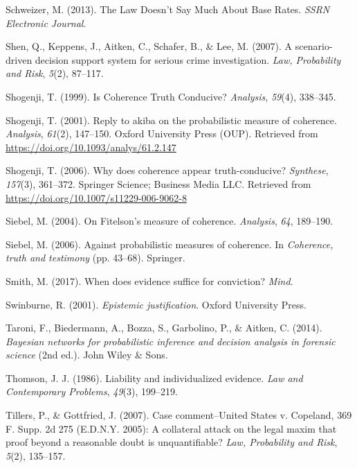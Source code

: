 \documentclass[11pt,dvipsnames,enabledeprecatedfontcommands]{scrartcl}
\begin{document}
\hypertarget{ref-schweizer2013LawDoesnSay}{}
Schweizer, M. (2013). The Law Doesn't Say Much About Base Rates.
\emph{SSRN Electronic Journal}.

\hypertarget{ref-shen2007ScenariodrivenDecisionSupporta}{}
Shen, Q., Keppens, J., Aitken, C., Schafer, B., \& Lee, M. (2007). A
scenario-driven decision support system for serious crime investigation.
\emph{Law, Probability and Risk}, \emph{5}(2), 87--117.

\hypertarget{ref-shogenji1999}{}
Shogenji, T. (1999). Is Coherence Truth Conducive? \emph{Analysis},
\emph{59}(4), 338--345.

\hypertarget{ref-Shogenji2001Reply}{}
Shogenji, T. (2001). Reply to akiba on the probabilistic measure of
coherence. \emph{Analysis}, \emph{61}(2), 147--150. Oxford University
Press (OUP). Retrieved from
\url{https://doi.org/10.1093/analys/61.2.147}

\hypertarget{ref-Shogenji2006Why}{}
Shogenji, T. (2006). Why does coherence appear truth-conducive?
\emph{Synthese}, \emph{157}(3), 361--372. Springer Science; Business
Media LLC. Retrieved from
\url{https://doi.org/10.1007/s11229-006-9062-8}

\hypertarget{ref-Siebel2004On-Fitelsons-me}{}
Siebel, M. (2004). On Fitelson's measure of coherence. \emph{Analysis},
\emph{64}, 189--190.

\hypertarget{ref-siebel2006against}{}
Siebel, M. (2006). Against probabilistic measures of coherence. In
\emph{Coherence, truth and testimony} (pp. 43--68). Springer.

\hypertarget{ref-Smith_conviction_mind_2017}{}
Smith, M. (2017). When does evidence suffice for conviction?
\emph{Mind}.

\hypertarget{ref-Swinburne2001-SWIEJ}{}
Swinburne, R. (2001). \emph{Epistemic justification}. Oxford University
Press.

\hypertarget{ref-taroni2006bayesian}{}
Taroni, F., Biedermann, A., Bozza, S., Garbolino, P., \& Aitken, C.
(2014). \emph{Bayesian networks for probabilistic inference and decision
analysis in forensic science} (2nd ed.). John Wiley \& Sons.

\hypertarget{ref-Thomson86}{}
Thomson, J. J. (1986). Liability and individualized evidence. \emph{Law
and Contemporary Problems}, \emph{49}(3), 199--219.

\hypertarget{ref-Tillers2007}{}
Tillers, P., \& Gottfried, J. (2007). Case comment--United States v.
Copeland, 369 F. Supp. 2d 275 (E.D.N.Y. 2005): A collateral attack on
the legal maxim that proof beyond a reasonable doubt is unquantifiable?
\emph{Law, Probability and Risk}, \emph{5}(2), 135--157.
\end{document}
